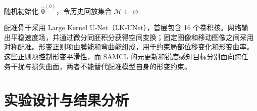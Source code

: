 \begin{algorithm}[htbp]
\caption{锐度感知元持续医学图像配准（SAMCL）}
\label{alg:samcl}
随机初始化 $\widehat{\boldsymbol{\theta}}^{(0)}$，令历史回放集合 $\mathcal{M}\leftarrow\varnothing$\;
\;
\end{algorithm}

配准骨干采用 Large Kernel U-Net（LK-UNet），首层包含 16 个卷积核\cite{jia2022lkunet}。网络输出平稳速度场，并通过微分同胚积分获得空间变换；固定图像和移动图像之间采用对称配准。形变正则项由膜能和弯曲能组成，用于约束局部位移变化和形变曲率\cite{ashburner2007diffeomorphic}。这些正则项控制形变平滑性，而 SAMCL 的元更新和锐度感知目标分别面向跨任务干扰与损失曲面，两者不能替代配准模型自身的形变约束。

\section{实验设计与结果分析}
\label{sec:registration-experiments}


